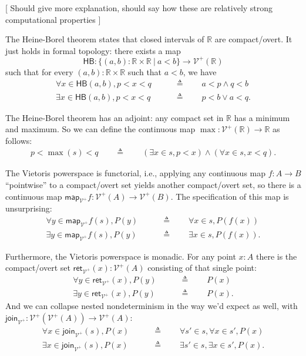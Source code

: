 \documentclass{article}           %
\newcommand{\R}{\mathbb{R}}
\newcommand{\suchthat}{\ |\ }
\newcommand{\Viet}{{\mathcal{V}^+}}
\newcommand{\map}[1]{\mathsf{map}_{#1}}
\newcommand{\ret}[1]{\mathsf{ret}_{#1}}
\newcommand{\join}[1]{\mathsf{join}_{#1}}
\newcommand{\HeineBorel}{\mathsf{HB}}
\newcommand{\defeq}{\triangleq}
\begin{document}
[ Should give more explanation, should say how these are relatively strong computational properties ]

The Heine-Borel theorem states that closed intervals of $\R$ are compact/overt.  It just holds in formal topology: there exists a map
\[
\HeineBorel : \{ (a, b) : \R \times \R \suchthat a < b \} \to \Viet(\R)
\]
such that for every $(a, b) : \R \times \R$ such that $a < b$, we have
\begin{align*}
\forall x \in \HeineBorel(a, b), p < x < q \qquad &\defeq \qquad a < p \wedge q < b
\\ \exists x \in \HeineBorel(a, b), p < x < q \qquad &\defeq \qquad p < b \vee a < q.
\end{align*}

The Heine-Borel theorem has an adjoint: any compact set in $\R$ has a minimum and maximum. So we can define the continuous map $\max : \Viet(\R) \to \R$ as follows:
\begin{align*}
p < \max(s) < q
\qquad \defeq \qquad 
\left( \exists x \in s, p < x \right) \wedge \left( \forall x \in s, x < q \right).
\end{align*}

The Vietoris powerspace is functorial, i.e., applying any continuous map $f : A \to B$ ``pointwise'' to a compact/overt set yields another compact/overt set, so there is a continuous map $\map{\Viet}{f} : \Viet(A) \to \Viet(B)$. The specification of this map is unsurprising:
\begin{align*}
\forall y \in \map{\Viet}{f}(s), P(y) \qquad &\defeq \qquad \forall x \in s, P(f(x))
\\ \exists y \in \map{\Viet}{f}(s), P(y)  \qquad &\defeq \qquad \exists x \in s, P(f(x)).
\end{align*}

Furthermore, the Vietoris powerspace is monadic. For any point $x : A$ there is the compact/overt set $\ret{\Viet}(x) : \Viet(A) $ consisting of that single point:
\begin{align*}
\forall y \in \ret{\Viet}(x), P(y) \qquad &\defeq \qquad P(x)
\\ \exists y \in \ret{\Viet}(x), P(y) \qquad &\defeq \qquad P(x).
\end{align*}
And we can collapse nested nondeterminism in the way we'd expect as well, with $\join{\Viet} : \Viet(\Viet(A)) \to \Viet(A)$:
\begin{align*}
\forall x \in \join{\Viet}(s), P(x) \qquad &\defeq \qquad \forall s' \in s, \forall x \in s', P(x)
\\ \exists x \in \join{\Viet}(s), P(x) \qquad &\defeq \qquad \exists s' \in s, \exists x \in s', P(x).
\end{align*}
\end{document}
